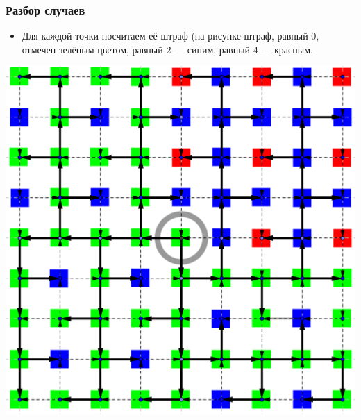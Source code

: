 \begin{frame}
    \frametitle{Разбор случаев}

    \begin{itemize}
        \item Для каждой точки посчитаем её штраф (на рисунке штраф, равный $0$, отмечен зелёным цветом, равный $2$ --- синим, равный $4$ --- красным.
    \end{itemize}
    \includegraphics[scale=0.6]{manhattan/pics/even_even_penalty.png}
\end{frame}

